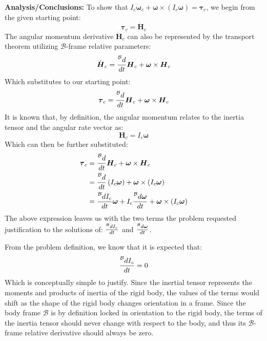 \documentclass[titlepage]{article}
\begin{document}
\textbf{Analysis/Conclusions:}
To show that $I_c\dot{\boldsymbol{\omega}}_c+\boldsymbol{\omega}\times(I_c\boldsymbol{\omega})=\boldsymbol{\tau}_c$, we begin from the given starting point:
\begin{equation}
	\boldsymbol{\tau}_c=\dot{\boldsymbol{H}}_c
\end{equation}
The angular momentum derivative $\dot{\boldsymbol{H}}_c$ can also be represented by the transport theorem utilizing $\mathcal{B}$-frame relative parameters:
\begin{equation}
	\dot{\boldsymbol{H}}_c=\frac{\prescript{\mathcal{B}}{}{d}}{dt}\boldsymbol{H}_c+\boldsymbol{\omega}\times\boldsymbol{H}_c
\end{equation}
Which substitutes to our starting point:
\begin{equation}
	\boldsymbol{\tau}_c=\frac{\prescript{\mathcal{B}}{}{d}}{dt}\boldsymbol{H}_c+\boldsymbol{\omega}\times\boldsymbol{H}_c
\end{equation}
It is known that, by definition, the angular momentum relates to the inertia tensor and the angular rate vector as:
\begin{equation}
	\boldsymbol{H}_c=I_c\boldsymbol{\omega}
\end{equation}
Which can then be further substituted:
\begin{equation}
	\begin{split}
		\boldsymbol{\tau}_c&=\frac{\prescript{\mathcal{B}}{}{d}}{dt}\boldsymbol{H}_c+\boldsymbol{\omega}\times\boldsymbol{H}_c \\
		&=\frac{\prescript{\mathcal{B}}{}{d}}{dt}\left(I_c\boldsymbol{\omega}\right)+\boldsymbol{\omega}\times\left(I_c\boldsymbol{\omega}\right) \\
		&=\frac{\prescript{\mathcal{B}}{}{d I_c}}{dt}\boldsymbol{\omega}+I_c\frac{\prescript{\mathcal{B}}{}{d \boldsymbol{\omega}}}{dt}+\boldsymbol{\omega}\times\left(I_c\boldsymbol{\omega}\right) \\
	\end{split}
\end{equation}
The above expression leaves us with the two terms the problem requested justification to the solutions of: $\frac{\prescript{\mathcal{B}}{}{d I_c}}{dt}$ and $\frac{\prescript{\mathcal{B}}{}{d \boldsymbol{\omega}}}{dt}$.
\begin{mdframed}[linewidth=1pt, innertopmargin=10pt, innerbottommargin=10pt]
	From the problem definition, we know that it is expected that:
	\begin{equation}
		\frac{\prescript{\mathcal{B}}{}{d I_c}}{dt}=0
	\end{equation}
	Which is conceptually simple to justify. Since the inertial tensor represents the moments and products of inertia of the rigid body, the values of the terms would shift as the shape of the rigid body changes orientation in a frame. Since the body frame $\mathcal{B}$ is by definition locked in orientation to the rigid body, the terms of the inertia tensor should never change with respect to the body, and thus its $\mathcal{B}$-frame relative derivative should always be zero.
\end{mdframed}
\end{document}
